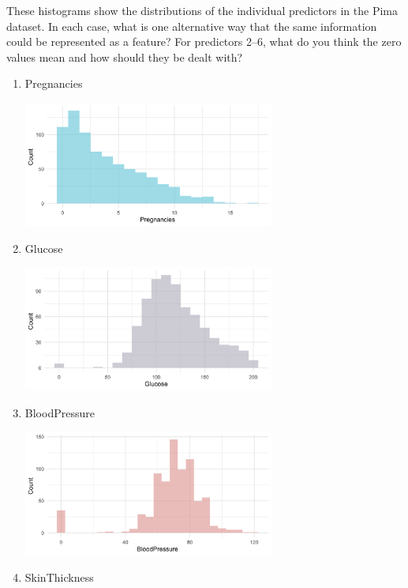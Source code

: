 \begin{question}{}
These histograms show the distributions of the individual predictors in the Pima dataset. In each case, what is one alternative way that the same information could be represented as a feature? For predictors 2--6, what do you think the zero values mean and how should they be dealt with?
  \begin{enumerate}
  \item Pregnancies
    \begin{center}
    \includegraphics[width=0.65\textwidth]{img/pima-pregnancies.png}
    \end{center}
    \newpage
  \item Glucose
    \begin{center}
    \includegraphics[width=0.65\textwidth]{img/pima-glucose.png}
    \end{center}
  \item BloodPressure
    \begin{center}
    \includegraphics[width=0.65\textwidth]{img/pima-blood-pressure.png}
    \end{center}
  \item SkinThickness
    \begin{center}

\end{center}
\end{enumerate}
\end{question}
